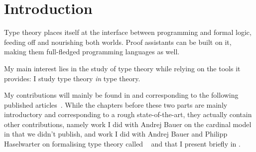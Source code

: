 \chapter{Introduction}


Type theory places itself at the interface between programming and formal logic,
feeding off and nourishing both worlds. Proof assistants can be built on it,
making them full-fledged programming languages as well.

My main interest lies in the study of type theory while relying on the tools it
provides: I study type theory \emph{in} type theory.

My contributions will mainly be found in  and
 corresponding to the following published
articles~.
While the chapters before these two parts are mainly introductory and
corresponding to a rough state-of-the-art, they actually contain other
contributions, namely work I did with Andrej Bauer on the cardinal model
in  that we didn't publish, and work I did with Andrej Bauer
and Philipp Haselwarter on formalising type theory called
\ftt~ and that I present briefly in
.

